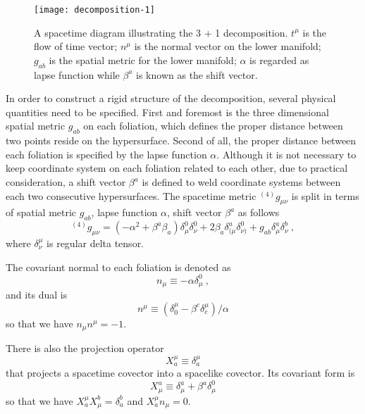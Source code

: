\begin{figure}[hbtp]
\centering
\texttt{[image: decomposition-1]}
\caption{A spacetime diagram illustrating the 3 + 1 decomposition. $t^{\mu}$ is the flow of time vector; $n^{\mu}$ is the normal vector on the lower manifold; $g_{ab}$ is the spatial metric for the lower manifold; $\alpha$ is regarded as lapse function while $\beta^{a}$ is known as the shift vector. }
\end{figure}\label{3+1diagram}

In order to  construct a rigid structure of the decomposition, several physical quantities need to be specified. First and foremost is the three dimensional spatial metric $g_{ab}$ on each foliation, which defines the proper distance between two points reside on the hypersurface. Second of all, the proper distance between each foliation is specified by the lapse function $\alpha$. Although it is not necessary to keep coordinate system on each foliation related to each other, due to practical consideration, a shift vector $\beta^{a}$ is defined to weld coordinate systems between each two consecutive hypersurfaces. The spacetime metric $^{(4)}g_{\mu\nu}$ is split in terms of spatial metric $g_{ab}$, lapse function $\alpha$, shift vector $\beta^{a}$ as follows
\begin{equation}
	{}^{\left(4\right)}g_{\mu\nu} = \left(-\alpha^2 + \beta^{a}\beta_{a}\right)\delta_\mu^0\delta_\nu^0 
	+ 2\beta_{a}\delta_{(\mu}^a\delta_{\nu)}^0 + g_{ab} \delta^a_\mu \delta^b_\nu \ ,
\end{equation}
where $\delta^{\mu}_{\nu}$ is regular delta tensor. 

The covariant normal to each foliation is denoted as
\begin{equation}\label{normal covector}
n_{\mu} \equiv -\alpha\delta^{0}_{\mu} \ ,
\end{equation}
and its dual is
\begin{equation}\label{normal vector}
n^{\mu} \equiv \left(\delta^{\mu}_{0} - \beta^{c}\delta^{\mu}_{c}\right)/\alpha
\end{equation}
so that we have $n_{\mu}n^{\mu} = -1$. 

There is also the projection operator
\begin{equation}\label{projection 1}
X^{\mu}_{a} \equiv \delta^{\mu}_{a}
\end{equation}
that projects a spacetime covector into a spacelike covector. Its covariant form is
\begin{equation}\label{projection 2}
X^{a}_{\mu} \equiv \delta^{a}_{\mu} + \beta^{a}\delta^{0}_{\mu}
\end{equation}
so that we have $X^{\mu}_{a}X^{b}_{\mu} = \delta^{b}_{a}$ and $X^{\mu}_{a}n_{\mu} = 0$. 

